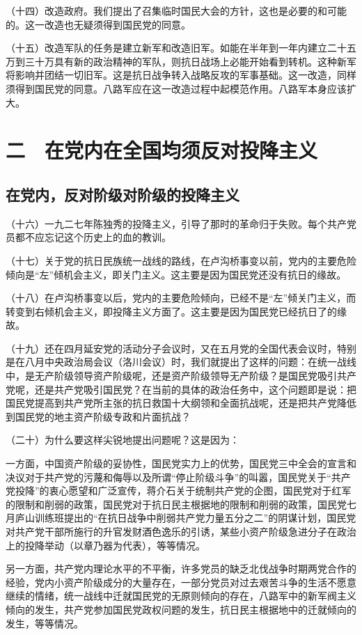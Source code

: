 （十四）改造政府。我们提出了召集临时国民大会的方针，这也是必要的和可能的。这一改造也无疑须得到国民党的同意。

（十五）改造军队的任务是建立新军和改造旧军。如能在半年到一年内建立二十五万到三十万具有新的政治精神的军队，则抗日战场上必能开始看到转机。这种新军将影响并团结一切旧军。这是抗日战争转入战略反攻的军事基础。这一改造，同样须得到国民党的同意。八路军应在这一改造过程中起模范作用。八路军本身应该扩大。

\section{二　在党内在全国均须反对投降主义}

\subsection{在党内，反对阶级对阶级的投降主义}

（十六）一九二七年陈独秀的投降主义，引导了那时的革命归于失败。每个共产党员都不应忘记这个历史上的血的教训。

（十七）关于党的抗日民族统一战线的路线，在卢沟桥事变以前，党内的主要危险倾向是“左”倾机会主义，即关门主义。这主要是因为国民党还没有抗日的缘故。

（十八）在卢沟桥事变以后，党内的主要危险倾向，已经不是“左”倾关门主义，而转变到右倾机会主义，即投降主义方面了。这主要是因为国民党已经抗日了的缘故。

（十九）还在四月延安党的活动分子会议时，又在五月党的全国代表会议时，特别是在八月中央政治局会议（洛川会议）时，我们就提出了这样的问题：在统一战线中，是无产阶级领导资产阶级呢，还是资产阶级领导无产阶级？是国民党吸引共产党呢，还是共产党吸引国民党？在当前的具体的政治任务中，这个问题即是说：把国民党提高到共产党所主张的抗日救国十大纲领和全面抗战呢，还是把共产党降低到国民党的地主资产阶级专政和片面抗战？

（二十）为什么要这样尖锐地提出问题呢？这是因为：

一方面，中国资产阶级的妥协性，国民党实力上的优势，国民党三中全会的宣言和决议对于共产党的污蔑和侮辱以及所谓“停止阶级斗争”的叫嚣，国民党关于“共产党投降”的衷心愿望和广泛宣传，蒋介石关于统制共产党的企图，国民党对于红军的限制和削弱的政策，国民党对于抗日民主根据地的限制和削弱的政策，国民党七月庐山训练班提出的“在抗日战争中削弱共产党力量五分之二”的阴谋计划，国民党对共产党干部所施行的升官发财酒色逸乐的引诱，某些小资产阶级急进分子在政治上的投降举动（以章乃器为代表），等等情况。

另一方面，共产党内理论水平的不平衡，许多党员的缺乏北伐战争时期两党合作的经验，党内小资产阶级成分的大量存在，一部分党员对过去艰苦斗争的生活不愿意继续的情绪，统一战线中迁就国民党的无原则倾向的存在，八路军中的新军阀主义倾向的发生，共产党参加国民党政权问题的发生，抗日民主根据地中的迁就倾向的发生，等等情况。

